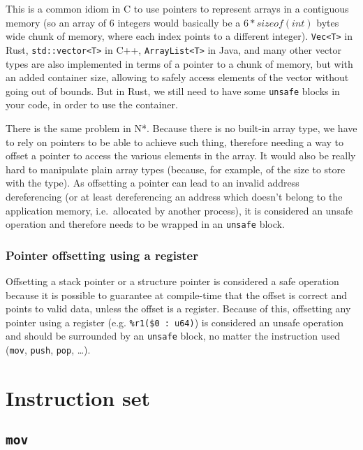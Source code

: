This is a common idiom in C to use pointers to represent arrays in a contiguous memory (so an array of 6 integers would basically be a $6 * sizeof(int)$ bytes wide chunk of memory, where each index points to a different integer).
\texttt{Vec<T>} in Rust, \texttt{std::vector<T>} in C++, \texttt{ArrayList<T>} in Java, and many other vector types are also implemented in terms of a pointer to a chunk of memory, but with an added container size, allowing to safely access elements of the vector without going out of bounds.
But in Rust, we still need to have some \texttt{unsafe} blocks in your code, in order to use the container.

There is the same problem in N*.
Because there is no built-in array type, we have to rely on pointers to be able to achieve such thing, therefore needing a way to offset a pointer to access the various elements in the array.
It would also be really hard to manipulate plain array types (because, for example, of the size to store with the type).
As offsetting a pointer can lead to an invalid address dereferencing (or at least dereferencing an address which doesn't belong to the application memory, i.e.\ allocated by another process), it is considered an unsafe operation and therefore needs to be wrapped in an \texttt{unsafe} block.

\subsection{Pointer offsetting using a register}\label{subsec:nstar-common-unsafe-ptroffsetreg}

Offsetting a stack pointer or a structure pointer is considered a safe operation because it is possible to guarantee at compile-time that the offset is correct and points to valid data, unless the offset is a register.
Because of this, offsetting any pointer using a register (e.g. \texttt{\%r1(\$0 : u64)}) is considered an unsafe operation and should be surrounded by an \texttt{unsafe} block, no matter the instruction used (\texttt{mov}, \texttt{push}, \texttt{pop}, \ldots).

\chapter{Instruction set}\label{chap:nstar-instructionset}

\section{\texttt{mov}}\label{sec:nstar-instructionset-mov}

